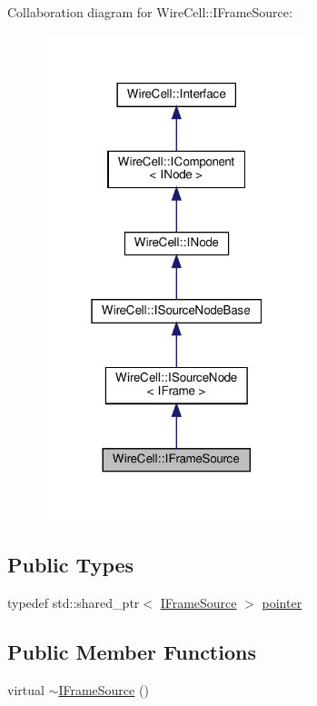 Collaboration diagram for Wire\+Cell\+:\+:I\+Frame\+Source\+:
\nopagebreak
\begin{figure}[H]
\begin{center}
\leavevmode
\includegraphics[width=220pt]{class_wire_cell_1_1_i_frame_source__coll__graph}
\end{center}
\end{figure}
\subsection*{Public Types}
\begin{DoxyCompactItemize}
\item 
typedef std\+::shared\+\_\+ptr$<$ \hyperlink{class_wire_cell_1_1_i_frame_source}{I\+Frame\+Source} $>$ \hyperlink{class_wire_cell_1_1_i_frame_source_a1a5173edbaf8f3317b3c93baa9b12dc6}{pointer}
\end{DoxyCompactItemize}
\subsection*{Public Member Functions}
\begin{DoxyCompactItemize}
\item 
virtual \hyperlink{class_wire_cell_1_1_i_frame_source_a914c0d60dd1801a92653dd4138d15cb9}{$\sim$\+I\+Frame\+Source} ()
\end{DoxyCompactItemize}


